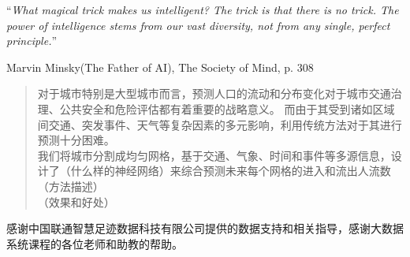 \documentclass[
11pt, %
english, %
singlespacing, %
headsepline, %
]{MastersDoctoralThesis} %
\begin{document}
\cleardoublepage


\vspace*{0.2\textheight}

\noindent\enquote{\itshape What magical trick makes us intelligent? The trick is that there is no trick. The power of intelligence stems from our vast diversity, not from any single, perfect principle.}\bigbreak

\hfill Marvin Minsky(The Father of AI), The Society of Mind, p. 308


\begin{abstract}
\addchaptertocentry{\abstractname} %
对于城市特别是大型城市而言，预测人口的流动和分布变化对于城市交通治理、公共安全和危险评估都有着重要的战略意义。 而由于其受到诸如区域间交通、突发事件、天气等复杂因素的多元影响，利用传统方法对于其进行预测十分困难。\\
我们将城市分割成均匀网格，基于交通、气象、时间和事件等多源信息，设计了（什么样的神经网络）来综合预测未来每个网格的进入和流出人流数（方法描述）\\
（效果和好处）
\end{abstract}


\begin{acknowledgements}
\addchaptertocentry{\acknowledgementname} %
感谢中国联通智慧足迹数据科技有限公司提供的数据支持和相关指导，感谢大数据系统课程的各位老师和助教的帮助。
\end{acknowledgements}


\tableofcontents %
\end{document}
